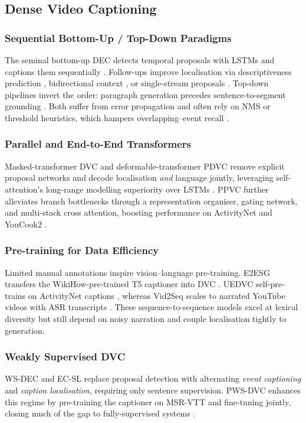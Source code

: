 \subsection{Dense Video Captioning}
\subsubsection{Sequential Bottom-Up / Top-Down Paradigms}  
The seminal bottom-up DEC detects temporal proposals with LSTMs and captions them sequentially \cite{Krishna2017-pw}.  
Follow-ups improve localisation via descriptiveness prediction \cite{Li2018-ll}, bidirectional context \cite{Wang2018-ap}, or single-stream proposals \cite{Mun2019-ap}.  
Top-down pipelines invert the order: paragraph generation precedes sentence-to-segment grounding \cite{Deng2021-qd}.  
Both suffer from error propagation and often rely on NMS or threshold heuristics, which hampers overlapping–event recall \cite{lin2018bsn}.

\subsubsection{Parallel and End-to-End Transformers}  
Masked-transformer DVC \cite{Zhou2018-zu} and deformable-transformer PDVC \cite{Wang2021-zi} remove explicit proposal networks and decode localisation \emph{and} language jointly, leveraging self-attention’s long-range modelling superiority over LSTMs \cite{vaswani2017attention}.  
PPVC further alleviates branch bottlenecks through a representation organiser, gating network, and multi-stack cross attention, boosting performance on ActivityNet and YouCook2 \cite{Choi2023-so}.

\subsubsection{Pre-training for Data Efficiency}  
Limited manual annotations inspire vision–language pre-training.  
E2ESG transfers the WikiHow-pre-trained T5 captioner into DVC \cite{Zhu2022-mg}.  
UEDVC self-pre-trains on ActivityNet captions \cite{Zhang2022-ni}, whereas Vid2Seq scales to narrated YouTube videos with ASR transcripts \cite{Yang2023-fm}.  
These sequence-to-sequence models excel at lexical diversity but still depend on noisy narration and couple localisation tightly to generation.

\subsubsection{Weakly Supervised DVC}  
WS-DEC \cite{Duan2018-qf} and EC-SL \cite{Chen2021-sv} replace proposal detection with alternating \emph{event captioning} and \emph{caption localisation}, requiring only sentence supervision.  
PWS-DVC enhances this regime by pre-training the captioner on MSR-VTT and fine-tuning jointly, closing much of the gap to fully-supervised systems \cite{Aafaq2023-vk}.

